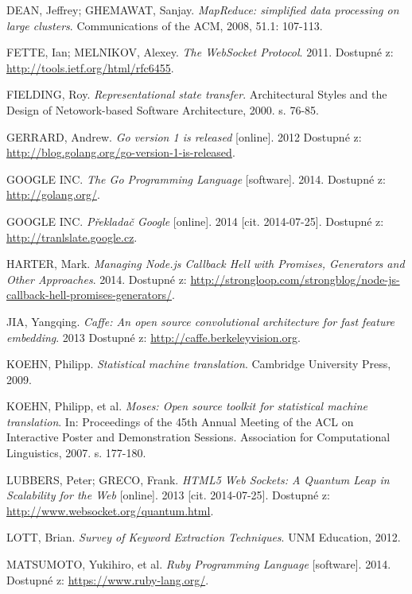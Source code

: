 \begin{thebibliography}{99}
  DEAN, Jeffrey; GHEMAWAT, Sanjay. \textit{MapReduce: simplified data processing on large clusters}. Communications of the ACM, 2008, 51.1: 107-113.

  FETTE, Ian; MELNIKOV, Alexey. \textit{The WebSocket Protocol}. 2011.
  Dostupné z: \url{http://tools.ietf.org/html/rfc6455}.

  FIELDING, Roy. \textit{Representational state transfer}. Architectural Styles and the Design of Netowork-based Software Architecture, 2000. s. 76-85.

  GERRARD, Andrew.
  \emph{Go version 1 is released} [online]. 2012
  Dostupné z: \url{http://blog.golang.org/go-version-1-is-released}.

  GOOGLE INC. \textit{The Go Programming Language} [software]. 2014.
  Dostupné z: \url{http://golang.org/}.

  GOOGLE INC. \textit{Překladač Google} [online]. 2014 [cit. 2014-07-25].
  Dostupné z: \url{http://tranlslate.google.cz}.

  HARTER, Mark. \textit{Managing Node.js Callback Hell with Promises, Generators and Other Approaches}. 2014.
  Dostupné z: \url{http://strongloop.com/strongblog/node-js-callback-hell-promises-generators/}.

  JIA, Yangqing. \textit{Caffe: An open source convolutional architecture for fast feature embedding}. 2013
  Dostupné z: \url{http://caffe.berkeleyvision.org}.

  KOEHN, Philipp. \textit{Statistical machine translation}. Cambridge University Press, 2009.

  KOEHN, Philipp, et al. \textit{Moses: Open source toolkit for statistical machine translation}. In: Proceedings of the 45th Annual Meeting of the ACL on Interactive Poster and Demonstration Sessions. Association for Computational Linguistics, 2007. s. 177-180.

  LUBBERS, Peter; GRECO, Frank. \textit{HTML5 Web Sockets: A Quantum Leap in Scalability for the Web} [online].
  2013 [cit. 2014-07-25].
  Dostupné z: \url{http://www.websocket.org/quantum.html}.

  LOTT, Brian. \textit{Survey of Keyword Extraction Techniques}. UNM Education, 2012.

  MATSUMOTO, Yukihiro, et al. \textit{Ruby Programming Language} [software]. 2014.
  Dostupné z: \url{https://www.ruby-lang.org/}.


\end{thebibliography}
